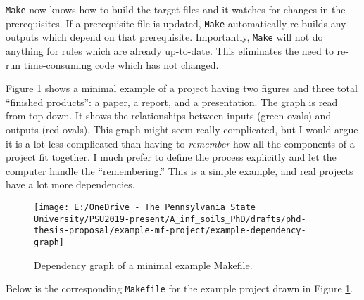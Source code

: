\documentclass[
  letterpaper,
  openany]{book}
\begin{document}
\texttt{Make} now knows how to build the target files and it watches for changes in the prerequisites.
If a prerequisite file is updated, \texttt{Make} automatically re-builds any outputs which depend on that prerequisite.
Importantly, \texttt{Make} will not do anything for rules which are already up-to-date. This eliminates the need to re-run time-consuming code which has not changed.

Figure \ref{fig:example-make-dependency-graph} shows a minimal example of a project having two figures and three total ``finished products'': a paper, a report, and a presentation.
The graph is read from top down. It shows the relationships between inputs (green ovals) and outputs (red ovals).
This graph might seem really complicated, but I would argue it is a lot less complicated than having to \emph{remember} how all the components of a project fit together.
I much prefer to define the process explicitly and let the computer handle the ``remembering.''
This is a simple example, and real projects have a lot more dependencies.

\begin{figure}

{\centering \texttt{[image: E:/OneDrive - The Pennsylvania State University/PSU2019-present/A\_inf\_soils\_PhD/drafts/phd-thesis-proposal/example-mf-project/example-dependency-graph]} 

}

\caption{Dependency graph of a minimal example Makefile.}\label{fig:example-make-dependency-graph}
\end{figure}

\newpage

Below is the corresponding \texttt{Makefile} for the example project drawn in Figure \ref{fig:example-make-dependency-graph}.
\end{document}
